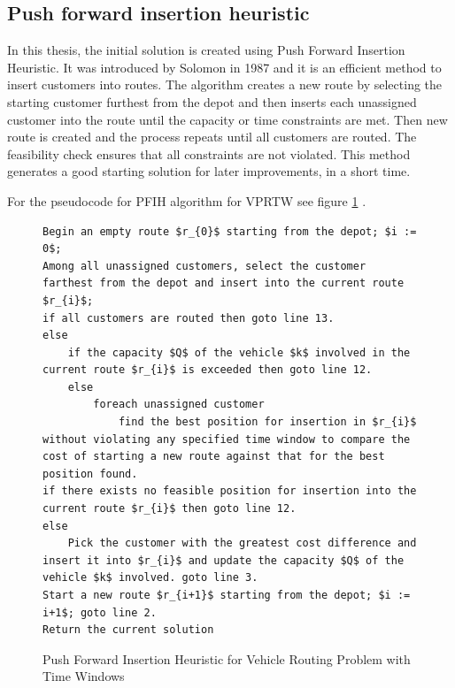 \documentclass[a4paper,twoside,12pt]{book}
\begin{document}
\subsection{Push forward insertion heuristic}
In this thesis, the initial solution is created using Push Forward Insertion Heuristic. It was introduced by Solomon \cite{bib:article:solomon} in 1987 and it is an efficient method to insert customers into routes. The algorithm creates a new route by selecting the starting customer furthest from the depot and then inserts each unassigned customer into the route until the capacity or time constraints are met. Then new route is created and the process repeats until all customers are routed. The feasibility check ensures that all constraints are not violated. This method generates a good starting solution for later improvements, in a short time.

For the pseudocode for PFIH algorithm for VPRTW see figure \ref{fig:PFIH} \cite{bib:chapter:PFIH}.
\begin{figure}
\centering
\begin{lstlisting}[mathescape=true]
Begin an empty route $r_{0}$ starting from the depot; $i := 0$;
Among all unassigned customers, select the customer farthest from the depot and insert into the current route $r_{i}$;
if all customers are routed then goto line 13.
else
    if the capacity $Q$ of the vehicle $k$ involved in the current route $r_{i}$ is exceeded then goto line 12.
	else
    	foreach unassigned customer
    		find the best position for insertion in $r_{i}$ without violating any specified time window to compare the cost of starting a new route against that for the best position found.   
if there exists no feasible position for insertion into the current route $r_{i}$ then goto line 12.
else
	Pick the customer with the greatest cost difference and insert it into $r_{i}$ and update the capacity $Q$ of the vehicle $k$ involved. goto line 3.
Start a new route $r_{i+1}$ starting from the depot; $i := i+1$; goto line 2.
Return the current solution
\end{lstlisting}
\caption{Push Forward Insertion Heuristic for Vehicle Routing Problem with Time Windows}
\label{fig:PFIH}
\end{figure}
\end{document}
